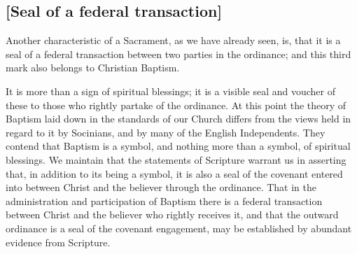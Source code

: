 \documentclass[
]{book}
\begin{document}
\hypertarget{seal-of-a-federal-transaction}{%
\subsection{{[}Seal of a federal transaction{]}}\label{seal-of-a-federal-transaction}}

Another characteristic of a Sacrament, as we have already seen, is, that it is a seal of a federal transaction between two parties in the ordinance; and this third mark also belongs to Christian Baptism.

It is more than a sign of spiritual blessings; it is a visible seal and voucher of these to those who rightly partake of the ordinance. At this point the theory of Baptism laid down in the standards of our Church differs from the views held in regard to it by Socinians, and by many of the English Independents. They contend that Baptism is a symbol, and nothing more than a symbol, of spiritual blessings. We maintain that the statements of Scripture warrant us in asserting that, in addition to its being a symbol, it is also a seal of the covenant entered into between Christ and the believer through the ordinance. That in the administration and participation of Baptism there is a federal transaction between Christ and the believer who rightly receives it, and that the outward ordinance is a seal of the covenant engagement, may be established by abundant evidence from Scripture.
\end{document}

